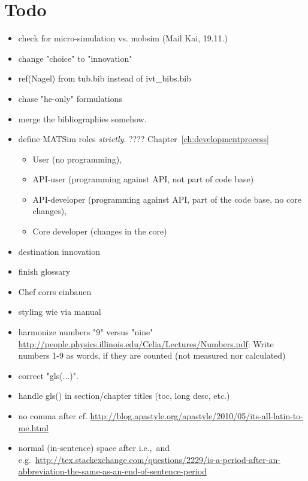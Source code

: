 \vfill\eject

\section*{Todo}

\begin{itemize}

\item check for micro-simulation vs. mobsim (Mail Kai, 19.11.)

\item change "choice" to "innovation"

\item ref(Nagel) from tub.bib instead of ivt\_bibs.bib

\item chase "he-only" formulations

\item merge the bibliographies somehow.

\item define MATSim roles \emph{strictly}. ???? Chapter~\ref{ch:developmentprocess}
\begin{itemize}
\item User (no programming), 
\item API-user (programming against API, not part of code base) 
\item API-developer (programming against API, part of the code base, no core changes), 
\item Core developer (changes in the core)
\end{itemize}

\item destination innovation

\item finish glossary

\item Chef corrs einbauen

\item styling wie via manual

\item harmonize numbers "9" versus "nine" \url{http://people.physics.illinois.edu/Celia/Lectures/Numbers.pdf}: Write numbers 1-9 as words, if they are counted (not measured nor calculated)

\item correct "gls(...)".

\item handle gls() in section/chapter titles (toc, long desc, etc.)

\item no comma after cf. \url{http://blog.apastyle.org/apastyle/2010/05/its-all-latin-to-me.html}

\item normal (in-sentence) space after i.e.,\ and e.g.\ \url{http://tex.stackexchange.com/questions/2229/is-a-period-after-an-abbreviation-the-same-as-an-end-of-sentence-period}

\end{itemize}

